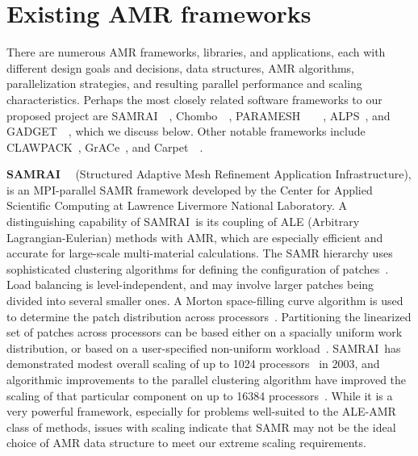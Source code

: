 \documentclass[11pt,letterpaper]{article}
\newcommand{\chombo}{\textsf{Chombo}}
\newcommand{\samrai}{\textsf{SAMRAI}}
\newcommand{\paramesh}{\textsf{PARAMESH}}
\newcommand{\gadget}{\textsf{GADGET}}
\newcommand{\alps}{\textsf{ALPS}}
\newcommand{\clawpack}{\textsf{CLAWPACK}}
\newcommand{\grace}{\textsf{GrACe}}
\newcommand{\carpet}{\textsf{Carpet}}
\begin{document}
\section{Existing AMR frameworks} \label{s:review}

There are numerous AMR frameworks, libraries, and applications, each
with different design goals and decisions, data structures, AMR
algorithms, parallelization strategies, and resulting parallel
performance and scaling characteristics.  Perhaps the most closely
related software frameworks to our proposed project are
\samrai~\cite{WiHo01}~\cite{wwwsamraicode},
\chombo~\cite{wwwchombo}~\cite{CoGr09},
\paramesh~\cite{MaOl00}~\cite{OlMa05}~\cite{Ol06}~\cite{wwwparamesh},
\alps~\cite{BuBu09}, and \gadget~\cite{wwwgadget}~\cite{Sp05}, which
we discuss below.  Other notable frameworks include
\clawpack~\cite{wwwclawpack}, \grace~\cite{PaLi10}, and
\carpet~\cite{ScDi06}~\cite{wwwcarpet}.


\textbf{\samrai}~\cite{WiHo01}~\cite{wwwsamraicode} (Structured
Adaptive Mesh Refinement Application Infrastructure), is an
MPI-parallel SAMR framework developed by the Center for Applied
Scientific Computing at Lawrence Livermore National Laboratory.  A
distinguishing capability of \samrai\ is its coupling of ALE
(Arbitrary Lagrangian-Eulerian) methods with AMR, which are especially
efficient and accurate for large-scale multi-material calculations.
The SAMR hierarchy uses sophisticated clustering algorithms for
defining the configuration of patches~\cite{GuWi06}.  Load balancing
is level-independent, and may involve larger patches being divided
into several smaller ones.  A Morton space-filling curve algorithm is
used to determine the patch distribution across
processors~\cite{WiHo01}.  Partitioning the linearized set of patches
across processors can be based either on a spacially uniform work
distribution, or based on a user-specified non-uniform
workload~\cite{wwwsamraicode}.  \samrai\ has demonstrated modest
overall scaling of up to 1024 processors~\cite{WiHy03} in 2003, and
algorithmic improvements to the parallel clustering algorithm have
improved the scaling of that particular component on up to 16384
processors~\cite{GuWi06}.  While it is a very powerful framework,
especially for problems well-suited to the ALE-AMR class of methods,
issues with scaling indicate that SAMR may not be the ideal choice of
AMR data structure to meet our extreme scaling requirements.
\end{document}
